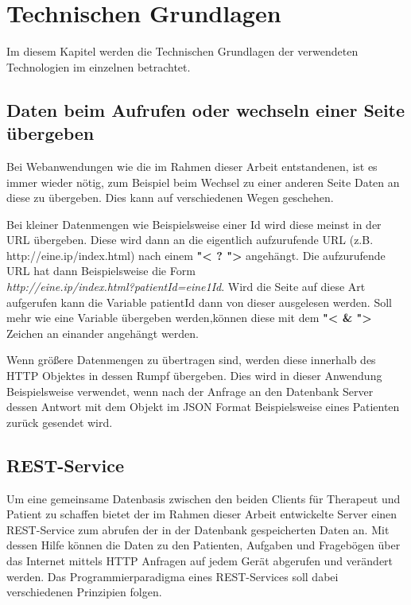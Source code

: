 

\chapter{Technischen Grundlagen} \label{Theoretische Grundlagen}
Im diesem Kapitel werden die Technischen Grundlagen der verwendeten Technologien im einzelnen betrachtet.

\section{Daten beim Aufrufen oder wechseln einer Seite übergeben}
Bei Webanwendungen wie die im Rahmen dieser Arbeit entstandenen, ist es immer wieder nötig, zum Beispiel beim Wechsel zu einer anderen Seite Daten an diese zu übergeben. Dies kann auf verschiedenen Wegen geschehen.

Bei kleiner Datenmengen wie Beispielsweise einer Id wird diese meinst in der URL übergeben. Diese wird dann an die eigentlich aufzurufende URL (z.B. http://eine.ip/index.html) nach einem \textbf{"< ? ">} angehängt.
Die aufzurufende URL hat dann Beispielsweise die Form \\ \textit{http://eine.ip/index.html?patientId=eine1Id}.
Wird die Seite auf diese Art aufgerufen kann die Variable patientId dann von dieser ausgelesen werden. Soll mehr wie eine Variable übergeben werden,können diese mit dem \textbf{"< \& ">} Zeichen an einander angehängt werden.

Wenn größere Datenmengen zu übertragen sind, werden diese innerhalb des HTTP Objektes in dessen Rumpf übergeben. Dies wird in dieser Anwendung Beispielsweise verwendet, wenn nach der Anfrage an den Datenbank Server dessen Antwort mit dem Objekt im JSON Format Beispielsweise eines Patienten zurück gesendet wird.

\section{REST-Service}
Um eine gemeinsame Datenbasis zwischen den beiden Clients für Therapeut und Patient zu schaffen bietet der im Rahmen dieser Arbeit entwickelte Server einen REST-Service zum abrufen der in der Datenbank gespeicherten Daten an. Mit dessen Hilfe können die Daten zu den Patienten, Aufgaben und Fragebögen über das Internet mittels HTTP Anfragen auf jedem Gerät abgerufen und verändert werden. Das Programmierparadigma eines REST-Services soll dabei verschiedenen Prinzipien folgen.

